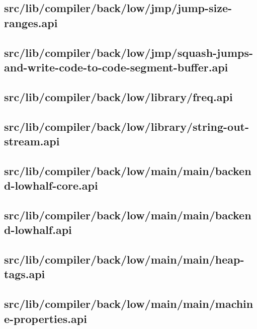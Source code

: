 \subsection{src/lib/compiler/back/low/jmp/jump-size-ranges.api}


\subsection{src/lib/compiler/back/low/jmp/squash-jumps-and-write-code-to-code-segment-buffer.api}


\subsection{src/lib/compiler/back/low/library/freq.api}


\subsection{src/lib/compiler/back/low/library/string-out-stream.api}


\subsection{src/lib/compiler/back/low/main/main/backend-lowhalf-core.api}


\subsection{src/lib/compiler/back/low/main/main/backend-lowhalf.api}


\subsection{src/lib/compiler/back/low/main/main/heap-tags.api}


\subsection{src/lib/compiler/back/low/main/main/machine-properties.api}


